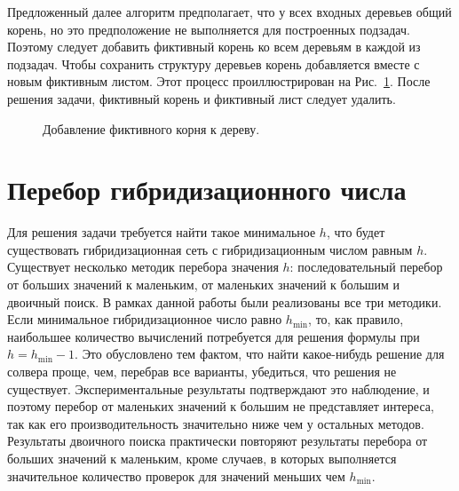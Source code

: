 Предложенный далее алгоритм предполагает, что у всех входных деревьев общий корень, но это предположение не выполняется для построенных подзадач.
Поэтому следует добавить фиктивный корень ко всем деревьям в каждой из подзадач.
Чтобы сохранить структуру деревьев корень добавляется вместе с новым фиктивным листом.
Этот процесс проиллюстрирован на Рис.~\ref{dummy-example}.
После решения задачи, фиктивный корень и фиктивный лист следует удалить.

\begin{figure}[t]
  \hspace{2cm}
  \caption{Добавление фиктивного корня к дереву.}
  \label{dummy-example}
\end{figure}

\FloatBarrier
\section{Перебор гибридизационного числа}

Для решения задачи требуется найти такое минимальное $h$, что будет существовать гибридизационная сеть с гибридизационным числом равным $h$.
Существует несколько методик перебора значения $h$: последовательный перебор от больших значений к маленьким, от маленьких значений к большим и двоичный поиск.
В рамках данной работы были реализованы все три методики.
Если минимальное гибридизационное число равно $h_\mathrm{min}$, то, как правило, наибольшее количество вычислений потребуется для решения формулы при $h = h_\mathrm{min} - 1$.
Это обусловлено тем фактом, что найти какое-нибудь решение для солвера проще, чем, перебрав все варианты, убедиться, что решения не существует.
Экспериментальные результаты подтверждают это наблюдение, и поэтому перебор от маленьких значений к большим не представляет интереса, так как его производительность значительно ниже чем у остальных методов.
Результаты двоичного поиска практически повторяют результаты перебора от больших значений к маленьким, кроме случаев, в которых выполняется значительное количество проверок для значений меньших чем $h_\mathrm{min}$.


